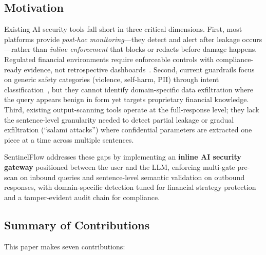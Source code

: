 \documentclass[journal]{IEEEtran}
\begin{document}
\subsection{Motivation}

Existing AI security tools fall short in three critical dimensions. First, most platforms provide \textit{post-hoc monitoring}---they detect and alert after leakage occurs---rather than \textit{inline enforcement} that blocks or redacts before damage happens. Regulated financial environments require enforceable controls with compliance-ready evidence, not retrospective dashboards~\cite{nist_ai_rmf, nist_ai_600_1}. Second, current guardrails focus on generic safety categories (violence, self-harm, PII) through intent classification~\cite{llama_guard, ms_prompt_shields}, but they cannot identify domain-specific data exfiltration where the query appears benign in form yet targets proprietary financial knowledge. Third, existing output-scanning tools operate at the full-response level; they lack the sentence-level granularity needed to detect partial leakage or gradual exfiltration (``salami attacks'') where confidential parameters are extracted one piece at a time across multiple sentences.

SentinelFlow addresses these gaps by implementing an \textbf{inline AI security gateway} positioned between the user and the LLM, enforcing multi-gate pre-scan on inbound queries and sentence-level semantic validation on outbound responses, with domain-specific detection tuned for financial strategy protection and a tamper-evident audit chain for compliance.

\subsection{Summary of Contributions}
This paper makes seven contributions:
\end{document}
